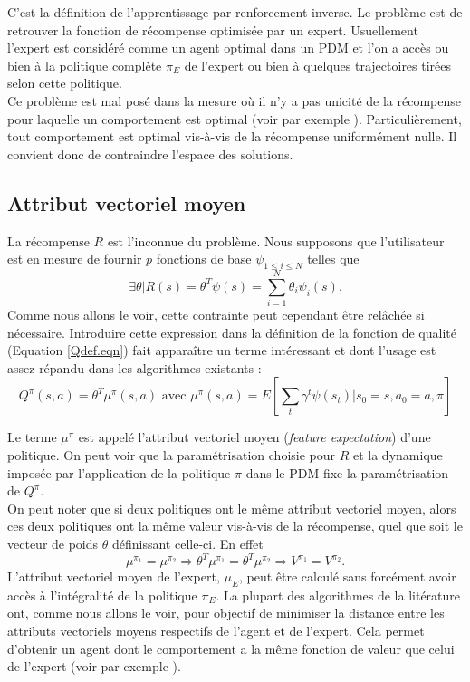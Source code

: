 \documentclass[publibook-draft]{CAp2012}
\begin{document}
C'est la définition de l'apprentissage par renforcement inverse. Le problème est de retrouver la fonction de récompense optimisée par un expert. Usuellement l'expert est considéré comme un agent optimal dans un PDM et l'on a accès ou bien à la politique complète $\pi_E$ de l'expert ou bien à quelques trajectoires tirées selon cette politique.\\

Ce problème est mal posé dans la mesure où il n'y a pas unicité de la récompense pour laquelle un comportement est optimal (voir par exemple \cite{ng1999policy}). Particulièrement, tout comportement est optimal vis-à-vis de la récompense uniformément nulle. Il convient donc de contraindre l'espace des solutions.
\subsection{Attribut vectoriel moyen}
\label{ConsiderationsTechniques.sec}
La récompense $R$ est l'inconnue du problème. Nous supposons que l'utilisateur est en mesure de fournir $p$ fonctions de base $\psi_{1\leq i \leq N}$ telles que
\begin{equation}
\label{hatRdef.eqn}
\exists \theta | R(s) = \theta^T\psi(s) = \sum_{i=1}^N\theta_i\psi_i(s).
\end{equation}
Comme nous allons le voir, cette contrainte peut cependant être relâchée si nécessaire. Introduire cette expression dans la définition de la fonction de qualité (Equation \eqref{Qdef.eqn}) fait apparaître un terme intéressant et dont l'usage est assez répandu dans les algorithmes existants :
\begin{equation}
Q^\pi(s,a) = \theta^T\mu^\pi(s,a) \textrm{ avec } \mu^\pi(s,a) = E[\sum_t\gamma^t\psi(s_t)|s_0=s,a_0=a,\pi]
\label{Qmu.eqn}
\end{equation}

Le terme $\mu^\pi$ est appelé l'attribut vectoriel moyen ({\it feature expectation}) d'une politique. On peut voir que la paramétrisation choisie pour $R$ et la dynamique imposée par l'application de la politique $\pi$ dans le PDM fixe la paramétrisation de $Q^\pi$.\\

On peut noter que si deux politiques ont le même attribut vectoriel moyen, alors ces deux politiques ont la même valeur vis-à-vis de la récompense, quel que soit le vecteur de poids $\theta$ définissant celle-ci. En effet
\begin{equation}
\mu^{\pi_1} = \mu^{\pi_2} \Rightarrow \theta^T\mu^{\pi_1} = \theta^T\mu^{\pi_2} \Rightarrow V^{\pi_1} = V^{\pi_2}.
\label{memevaleur.eqn}
\end{equation}
L'attribut vectoriel moyen de l'expert, $\mu_E$, peut être calculé sans forcément avoir accès à l'intégralité de la politique $\pi_E$. La plupart des algorithmes de la litérature ont, comme nous allons le voir, pour objectif de minimiser la distance entre les attributs vectoriels moyens respectifs de l'agent et de l'expert. Cela permet d'obtenir un agent dont le comportement a la même fonction de valeur que celui de l'expert (voir par exemple \cite{neu2009training}).
\end{document}
